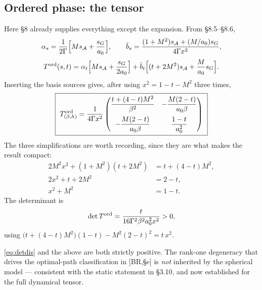 \subsection{Ordered phase: the tensor}
Here \S8 already supplies everything except the expansion. From \S8.5--\S8.6,
\begin{equation}
  \alpha_s=\frac{1}{2\Gamma}\Big[Ms_{\mathcal{A}}+\frac{s_G}{a_0}\Big],
  \qquad
  \bar b_s=\frac{(1+M^{2})s_{\mathcal{A}}+(M/a_0)s_G}{4\Gamma x^{2}} ,
\end{equation}
\begin{equation}
  T^{\rm ord}(s,t)=\alpha_t\Big[Ms_{\mathcal{A}}+\frac{s_G}{2a_0}\Big]
   +\bar b_t\Big[(t+2M^{2})s_{\mathcal{A}}+\frac{M}{a_0}s_G\Big] .
  \label{eq:bilinord}
\end{equation}
Inserting the basis sources gives, after using $x^{2}=1-t-M^{2}$ three times,
\begin{equation}
  \boxed{\ T^{\rm ord}_{(\beta,h)}=\frac{1}{4\Gamma x^{2}}
  \begin{pmatrix}
   \dfrac{t+(4-t)M^{2}}{\beta^{2}} & -\dfrac{M(2-t)}{a_0\beta}\\[10pt]
   -\dfrac{M(2-t)}{a_0\beta} & \dfrac{1-t}{a_0^{2}}
  \end{pmatrix}\ }
  \label{eq:Tord}
\end{equation}
The three simplifications are worth recording, since they are what makes the result compact:
\begin{align}
  2M^{2}x^{2}+(1+M^{2})(t+2M^{2})&=t+(4-t)M^{2},\\
  2x^{2}+t+2M^{2}&=2-t,\\
  x^{2}+M^{2}&=1-t .
\end{align}
The determinant is
\begin{equation}
  \det T^{\rm ord}=\frac{t}{16\Gamma^{2}\beta^{2}a_0^{2}x^{2}}>0 ,
\end{equation}
using $\big(t+(4-t)M^{2}\big)(1-t)-M^{2}(2-t)^{2}=t\,x^{2}$.

 \eqref{eq:detdis} and the above are both strictly
positive. The rank-one degeneracy that drives the optimal-path classification in [BR,\S e] is
\emph{not} inherited by the spherical model --- consistent with the static statement in
\S3.10, and now established for the full dynamical tensor.

